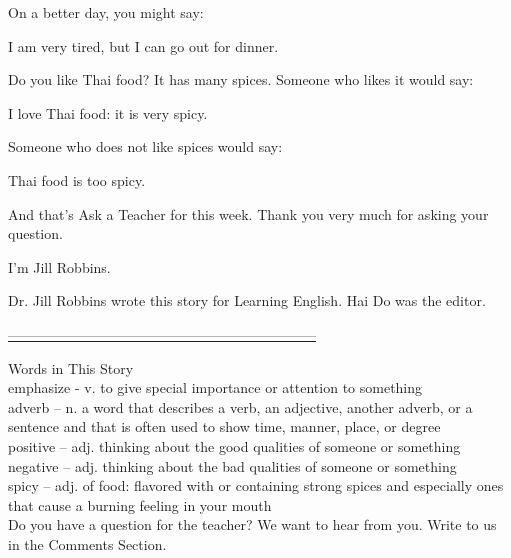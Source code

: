 On a better day, you might say:

I am very tired, but I can go out for dinner.

Do you like Thai food? It has many spices. Someone who likes it would say:

I love Thai food: it is very spicy.

Someone who does not like spices would say:

Thai food is too spicy.

And that's Ask a Teacher for this week. Thank you very much for asking your question.

I'm Jill Robbins.

Dr. Jill Robbins wrote this story for Learning English. Hai Do was the editor.

\underline{------------------------------------------------------------------}

Words in This Story \\

emphasize - v. to give special importance or attention to something \\

adverb – n. a word that describes a verb, an adjective, another adverb, or a sentence and that is often used to show time, manner, place, or degree \\

positive – adj. thinking about the good qualities of someone or something \\

negative – adj. thinking about the bad qualities of someone or something \\

spicy – adj. of food: flavored with or containing strong spices and especially ones that cause a burning feeling in your mouth \\

Do you have a question for the teacher? We want to hear from you. Write to us in the Comments Section. \\

